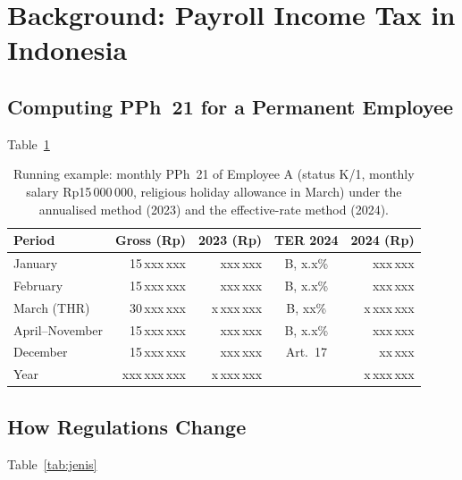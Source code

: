 \documentclass{ieeeaccess}
\begin{document}
\lipsum[97] %

\section{Background: Payroll Income Tax in Indonesia}
\lipsum[14][1-3]

\lipsum[98] %

\subsection{Computing PPh~21 for a Permanent Employee}
\lipsum[15] Table~\ref{tab:slip} \lipsum[16][1-4]

\begin{table}[!t]
\caption{Running example: monthly PPh~21 of Employee A (status K/1, monthly salary Rp15\,000\,000, religious holiday allowance in March) under the annualised method (2023) and the effective-rate method (2024).}
\label{tab:slip}
\centering\scriptsize
\setlength{\tabcolsep}{4pt}
\begin{tabular}{@{}lrrcr@{}}
\toprule
Period & Gross (Rp) & 2023 (Rp) & TER 2024 & 2024 (Rp) \\
\midrule
January & 15\,xxx\,xxx & xxx\,xxx & B, x.x\% & xxx\,xxx \\
February & 15\,xxx\,xxx & xxx\,xxx & B, x.x\% & xxx\,xxx \\
March (THR) & 30\,xxx\,xxx & x\,xxx\,xxx & B, xx\% & x\,xxx\,xxx \\
April--November & 15\,xxx\,xxx & xxx\,xxx & B, x.x\% & xxx\,xxx \\
December & 15\,xxx\,xxx & xxx\,xxx & Art.~17 & xx\,xxx \\
\midrule
Year & xxx\,xxx\,xxx & x\,xxx\,xxx & & x\,xxx\,xxx \\
\bottomrule
\end{tabular}
\end{table}

\lipsum[99] %

\subsection{How Regulations Change}
\lipsum[17] Table~\ref{tab:jenis} \lipsum[18][1-3]
\end{document}
